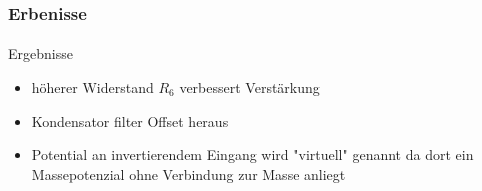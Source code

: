 \begin{frame}
\frametitle{Erbenisse}
\framesubtitle{}
\begin{block}{Ergebnisse}
     \begin{itemize}
         \item höherer Widerstand $R_6$ verbessert Verstärkung
         \item Kondensator filter Offset heraus
         \item Potential an invertierendem Eingang wird "virtuell" genannt da
         dort ein Massepotenzial ohne Verbindung zur Masse anliegt
     \end{itemize}
\end{block}
\end{frame}
